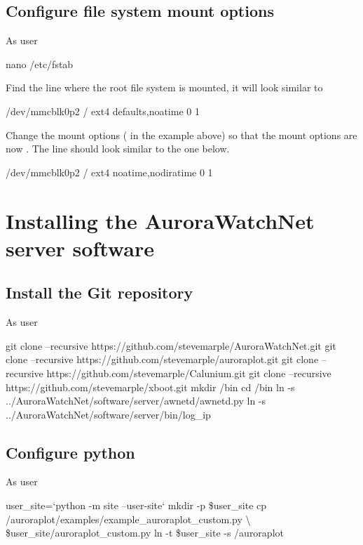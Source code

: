 \subsection{Configure file system mount options}

As user \rootUser
\begin{Cmd}
nano /etc/fstab  
\end{Cmd}

Find the line where the root file system is mounted, it will look
similar to
\begin{Cmd}
/dev/mmcblk0p2  /               ext4    defaults,noatime  0       1
\end{Cmd}
Change the mount options ( in the example
above) so that the mount options are now
. The line should look similar to the one
below.
\begin{Cmd}
/dev/mmcblk0p2  /               ext4    noatime,nodiratime  0       1
\end{Cmd}


\section{Installing the AuroraWatchNet server software}

\subsection{Install the Git repository}
As user \piUser
\begin{Cmd}
git clone --recursive https://github.com/stevemarple/AuroraWatchNet.git 
git clone --recursive https://github.com/stevemarple/auroraplot.git
git clone --recursive https://github.com/stevemarple/Calunium.git
git clone --recursive https://github.com/stevemarple/xboot.git
mkdir \mytilde/bin
cd \mytilde/bin
ln -s ../AuroraWatchNet/software/server/awnetd/awnetd.py
ln -s ../AuroraWatchNet/software/server/bin/log_ip
\end{Cmd}

\subsection{Configure python}

As user \piUser 

\begin{Cmd}
user_site=`python -m site --user-site`
mkdir -p \$user_site
cp \mytilde/auroraplot/examples/example_auroraplot_custom.py \textbackslash
    \$user_site/auroraplot_custom.py
ln -t \$user_site -s \mytilde/auroraplot
\end{Cmd}


